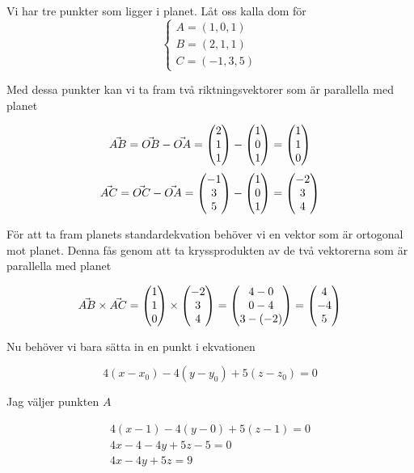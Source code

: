 \documentclass[../../main.tex]{subfiles}
\begin{document}
\begin{solution}{13}

Vi har tre punkter som ligger i planet. Låt oss kalla dom för
$$
\begin{cases}
A = (1, 0, 1)\\
B = (2, 1, 1)\\
C = (-1, 3, 5)
\end{cases}
$$

Med dessa punkter kan vi ta fram två riktningsvektorer som är parallella med planet


$$
\Vec{AB} = \Vec{OB} - \Vec{OA} = \begin{pmatrix}2\\1\\1\end{pmatrix} - \begin{pmatrix}1\\0\\1\end{pmatrix} = \begin{pmatrix}1\\1\\0\end{pmatrix}
$$
$$
\Vec{AC} = \Vec{OC} - \Vec{OA} = \begin{pmatrix}-1\\3\\5\end{pmatrix} - \begin{pmatrix}1\\0\\1\end{pmatrix} = \begin{pmatrix}-2\\3\\4\end{pmatrix}
$$

För att ta fram planets standardekvation behöver vi en vektor som är ortogonal mot planet. Denna fås genom att ta kryssprodukten av de två vektorerna som är parallella med planet

$$
\Vec{AB} \times \Vec{AC} = \begin{pmatrix}1\\1\\0\end{pmatrix} \times \begin{pmatrix}-2\\3\\4\end{pmatrix} = \begin{pmatrix}4-0\\0-4\\3-(-2)\end{pmatrix} = \begin{pmatrix}4\\-4\\5\end{pmatrix}
$$


Nu behöver vi bara sätta in en punkt i ekvationen 

$$
4(x-x_0) - 4(y - y_0) + 5(z-z_0) = 0
$$

Jag väljer punkten $A$

\begin{align*}
4(x - 1) - 4(y - 0) + 5(z - 1) = 0\\
4x - 4 - 4y + 5z - 5 = 0\\
4x - 4y + 5z = 9
\end{align*}

\end{solution}
\end{document}
